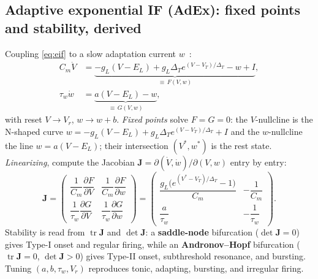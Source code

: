 \documentclass[11pt]{article}
\begin{document}
\subsection{Adaptive exponential IF (AdEx): fixed points and stability, derived}
Coupling \eqref{eq:eif} to a slow adaptation current $w$~\cite{brette2005}:
\begin{align}
  C_m\dot V&=\underbrace{-g_L(V-E_L)+g_L\Delta_T e^{(V-V_T)/\Delta_T}-w+I}_{\equiv\,F(V,w)},\\
  \tau_w\dot w&=\underbrace{a(V-E_L)-w}_{\equiv\,G(V,w)},
\end{align}
with reset $V\!\to\!V_r$, $w\!\to\!w+b$. \emph{Fixed points} solve $F=G=0$: the $V$-nullcline is the
N-shaped curve $w=-g_L(V-E_L)+g_L\Delta_T e^{(V-V_T)/\Delta_T}+I$ and the $w$-nullcline the line
$w=a(V-E_L)$; their intersection $(V^*,w^*)$ is the rest state. \emph{Linearizing}, compute the
Jacobian $\mathbf J=\partial(\dot V,\dot w)/\partial(V,w)$ entry by entry:
\begin{equation}
  \mathbf J=\begin{pmatrix}
   \dfrac{1}{C_m}\dfrac{\partial F}{\partial V} & \dfrac{1}{C_m}\dfrac{\partial F}{\partial w}\\[1.4ex]
   \dfrac{1}{\tau_w}\dfrac{\partial G}{\partial V} & \dfrac{1}{\tau_w}\dfrac{\partial G}{\partial w}
  \end{pmatrix}
  =\begin{pmatrix}
   \dfrac{g_L\big(e^{(V^*-V_T)/\Delta_T}-1\big)}{C_m} & -\dfrac{1}{C_m}\\[1.6ex]
   \dfrac{a}{\tau_w} & -\dfrac{1}{\tau_w}
  \end{pmatrix}.
\end{equation}
Stability is read from $\operatorname{tr}\mathbf J$ and $\det\mathbf J$: a \textbf{saddle-node}
bifurcation ($\det\mathbf J=0$) gives Type-I onset and regular firing, while an
\textbf{Andronov--Hopf} bifurcation ($\operatorname{tr}\mathbf J=0$, $\det\mathbf J>0$) gives Type-II
onset, subthreshold resonance, and bursting. Tuning $(a,b,\tau_w,V_r)$ reproduces tonic, adapting,
bursting, and irregular firing.
\end{document}
